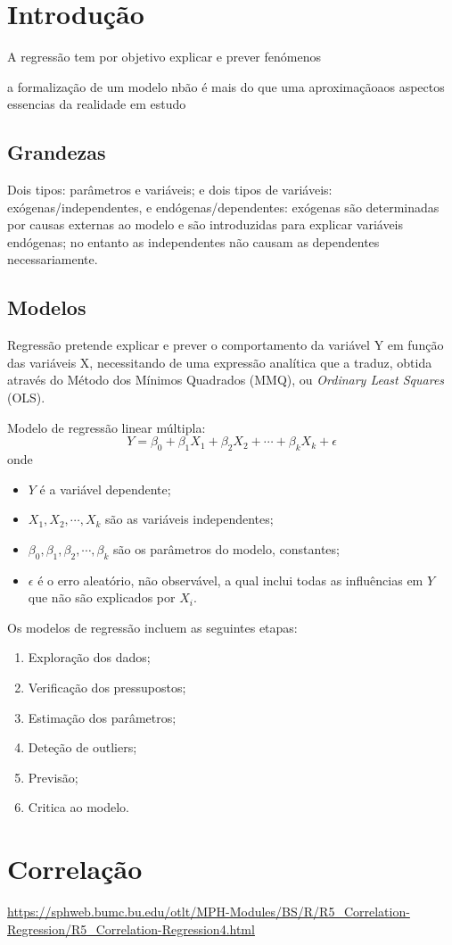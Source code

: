 \documentclass{assignment}
\begin{document}
\section*{Introdução}
A regressão tem por objetivo explicar e prever fenómenos

a formalização de um modelo nbão é mais do que uma aproximaçãoaos aspectos essencias da realidade em estudo

\subsection*{Grandezas}
Dois tipos: parâmetros e variáveis; e dois tipos de variáveis: exógenas/independentes, e endógenas/dependentes: exógenas são determinadas por causas externas ao modelo e são introduzidas para explicar variáveis endógenas; no entanto as independentes não causam as dependentes necessariamente.

\subsection*{Modelos}
Regressão pretende explicar e prever o comportamento da variável Y em função das variáveis X, necessitando de uma expressão analítica que a traduz, obtida através do Método dos Mínimos Quadrados (MMQ), ou \textit{Ordinary Least Squares} (OLS).


Modelo de regressão linear múltipla:
\begin{equation}
Y = \beta_0 + \beta_1 X_1 + \beta_2 X_2 + \cdots + \beta_k X_k + \epsilon
\end{equation}
onde
\begin{itemize}
  \item $Y$ é a variável dependente;
  \item $X_1, X_2, \cdots, X_k$ são as variáveis independentes;
  \item $\beta_0, \beta_1, \beta_2, \cdots, \beta_k$ são os parâmetros do  modelo, constantes;
  \item $\epsilon$ é o erro aleatório, não observável, a qual inclui todas as influências em $Y$ que não são explicados por $X_i$.
\end{itemize}
Os modelos de regressão incluem as seguintes etapas:
\begin{enumerate}
  \item Exploração dos dados;
  \item Verificação dos pressupostos;
  \item Estimação dos parâmetros;
  \item Deteção de outliers;
  \item Previsão;
  \item Critica ao modelo.
\end{enumerate}

\section*{Correlação}

\url{https://sphweb.bumc.bu.edu/otlt/MPH-Modules/BS/R/R5_Correlation-Regression/R5_Correlation-Regression4.html}
\end{document}
